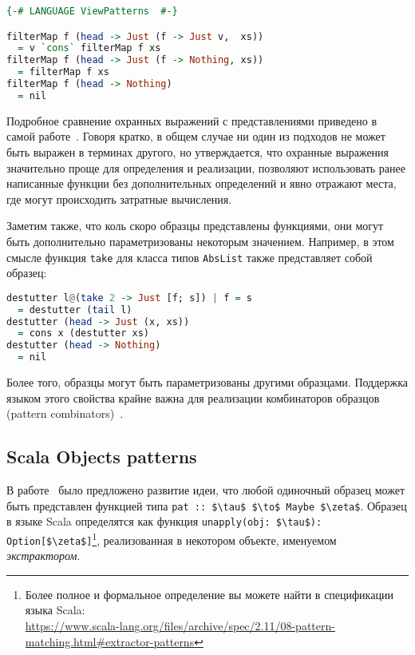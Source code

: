 \noindent
\raggedbottom
\begin{minipage}{\linewidth}
\begin{lstlisting}[language=haskell]
{-# LANGUAGE ViewPatterns  #-}

filterMap f (head -> Just (f -> Just v,  xs))
  = v `cons` filterMap f xs
filterMap f (head -> Just (f -> Nothing, xs)) 
  = filterMap f xs
filterMap f (head -> Nothing)
  = nil
\end{lstlisting}
\end{minipage}

Подробное сравнение охранных выражений с представлениями приведено в самой работе~\cite{erwig2000pattern}. Говоря кратко, в общем случае ни один из подходов не может быть выражен в терминах другого, но утверждается, что охранные выражения значительно проще для определения и реализации, позволяют использовать ранее написанные функции без дополнительных определений и явно отражают места, где могут происходить затратные вычисления.

Заметим также, что коль скоро образцы представлены функциями, они могут быть дополнительно параметризованы некоторым значением. Например, в этом смысле функция \lstinline|take| для класса типов \lstinline|AbsList| также представляет собой образец:

\noindent
\raggedbottom
\begin{minipage}{\linewidth}
\begin{lstlisting}[language=haskell]
destutter l@(take 2 -> Just [f; s]) | f = s 
  = destutter (tail l)
destutter (head -> Just (x, xs)) 
  = cons x (destutter xs)
destutter (head -> Nothing)      
  = nil
\end{lstlisting}
\end{minipage}

Более того, образцы могут быть параметризованы другими образцами. Поддержка языком этого свойства крайне важна для реализации комбинаторов образцов (pattern combinators)~\cite{tullsen2000firstclass}.

\subsection{Scala Objects patterns} \label{sec:scala_objects}
В работе~\cite{emir2007objects} было предложено развитие идеи, что любой одиночный образец может быть представлен функцией типа \lstinline[breaklines]|pat :: $\tau$ $\to$ Maybe $\zeta$|. Образец в языке Scala определятся как функция \lstinline[breaklines]|unapply(obj: $\tau$):| \lstinline[breaklines]|Option[$\zeta$]|\footnote{Более полное и формальное определение вы можете найти в спецификации языка Scala: \\ \url{https://www.scala-lang.org/files/archive/spec/2.11/08-pattern-matching.html\#extractor-patterns}}, реализованная в некотором объекте, именуемом \textit{экстрактором}. 


